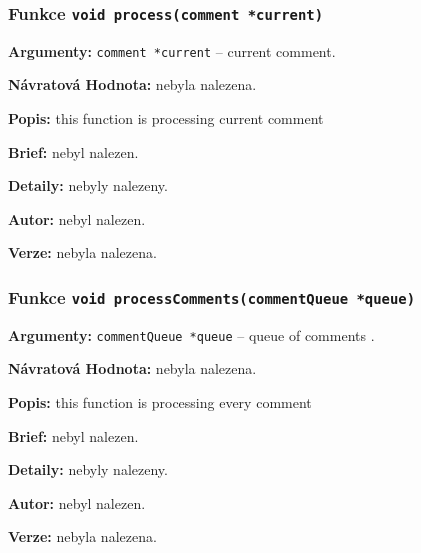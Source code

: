 \documentclass[12pt, a4paper]{article}
\begin{document}
\subsubsection{Funkce \texttt{void process(comment *current)}}
\textbf{Argumenty: }\verb"comment *current" -- current comment. \\
\par\noindent
\textbf{Návratová Hodnota: }nebyla nalezena.\\
\par\noindent
\textbf{Popis: }this function is processing current comment\\
\par\noindent
\textbf{Brief: }nebyl nalezen.\\
\par\noindent
\textbf{Detaily: }nebyly nalezeny.\\
\par\noindent
\textbf{Autor: }nebyl nalezen.\\
\par\noindent
\textbf{Verze: }nebyla nalezena.\\
\par\noindent
\subsubsection{Funkce \texttt{void processComments(commentQueue *queue)}}
\textbf{Argumenty: }\verb"commentQueue *queue" -- queue of comments . \\
\par\noindent
\textbf{Návratová Hodnota: }nebyla nalezena.\\
\par\noindent
\textbf{Popis: }this function is processing every comment\\
\par\noindent
\textbf{Brief: }nebyl nalezen.\\
\par\noindent
\textbf{Detaily: }nebyly nalezeny.\\
\par\noindent
\textbf{Autor: }nebyl nalezen.\\
\par\noindent
\textbf{Verze: }nebyla nalezena.\\
\par\noindent
\end{document}
